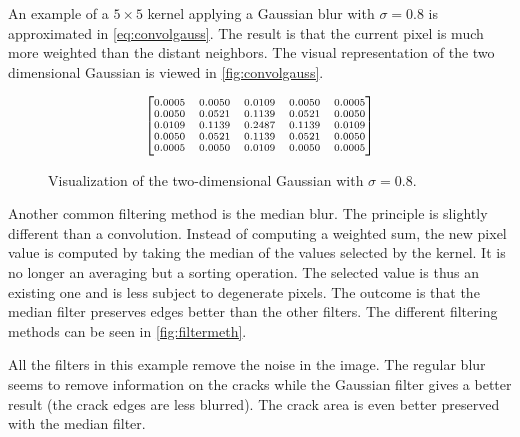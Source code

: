 An example of a $5 \times 5$ kernel applying a Gaussian blur with $\sigma = 0.8$ is approximated in \eqref{eq:convolgauss}. The result is that the current pixel is much more weighted than the distant neighbors. The visual representation of the two dimensional Gaussian is viewed in \autoref{fig:convolgauss}.

\begin{equation}
\label{eq:convolgauss}
{\scriptsize
\begin{bmatrix}
0.0005 & 0.0050 & 0.0109 & 0.0050 & 0.0005 \\
0.0050 & 0.0521 & 0.1139 & 0.0521 & 0.0050 \\
0.0109 & 0.1139 & 0.2487 & 0.1139 & 0.0109 \\
0.0050 & 0.0521 & 0.1139 & 0.0521 & 0.0050 \\
0.0005 & 0.0050 & 0.0109 & 0.0050 & 0.0005 \\
\end{bmatrix}
}
\end{equation}

\begin{figure}[!ht]
\centering
{}
\caption{Visualization of the two-dimensional Gaussian with $\sigma = 0.8$.}
\label{fig:convolgauss}
\end{figure}

Another common filtering method is the median blur. The principle is slightly different than a convolution. Instead of computing a weighted sum, the new pixel value is computed by taking the median of the values selected by the kernel. It is no longer an averaging but a sorting operation. The selected value is thus an existing one and is less subject to degenerate pixels. The outcome is that the median filter preserves edges better than the other filters. The different filtering methods can be seen in \autoref{fig:filtermeth}.

All the filters in this example remove the noise in the image. The regular blur seems to remove information on the cracks while the Gaussian filter gives a better result (the crack edges are less blurred). The crack area is even better preserved with the median filter.


